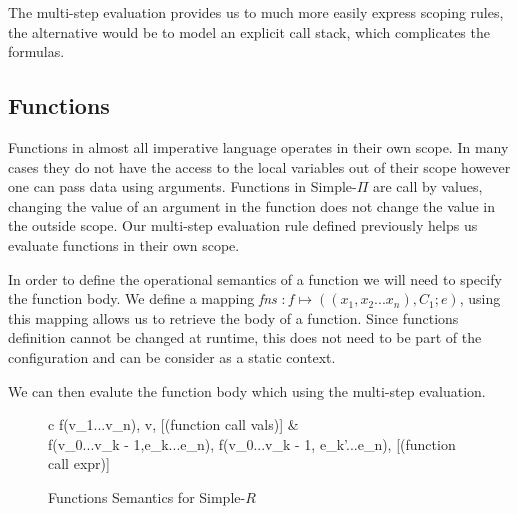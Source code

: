 \documentclass[a4paper,12pt]{report}
\begin{document}
\par
The multi-step evaluation provides us to much more easily express scoping rules, 
the alternative would be to model an explicit call stack, which complicates the 
formulas.

\subsection{Functions}
Functions in almost all imperative language operates in their own scope. In many 
cases they do not have the access to the local variables out of their scope however 
one can pass data using arguments. Functions in Simple-$\Pi$ are call by values, 
changing the value of an argument in the function does not change the value in 
the outside scope. Our multi-step evaluation rule defined previously helps us 
evaluate functions in their own scope. 

\par
In order to define the operational semantics of a function we will need to 
specify the function body. We define a mapping 
\textit{fns} $: f \mapsto ((x_1, x_2...x_n), C_1;e)$, 
using this mapping allows us to retrieve the body of a function. Since functions 
definition cannot be changed at runtime, this does not need to be part of the 
configuration and can be consider as a static context.

\par
We can then evalute the function body which using the multi-step evaluation.

\begin{figure}[H]
  \begin{center}
    \begin{tabular} {c}
      {\langle f(v_1...v_n), \sigma \rangle \Longrightarrow \langle v, \sigma \rangle} [(function call vals)]
      & \\
      {\langle f(v_0...v_{k - 1},e_k...e_n), \sigma \rangle \Longrightarrow \langle f(v_0...v_{k - 1}, e_{k}'...e_n), \sigma \rangle} [(function call expr)]
    \end{tabular}
  \end{center}
  \caption{Functions Semantics for Simple-$R$}
\end{figure}
\end{document}
